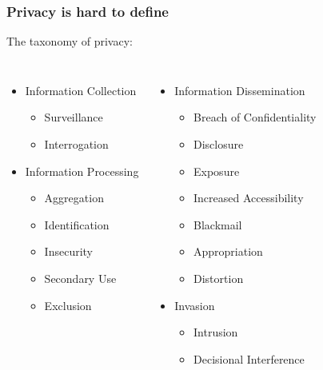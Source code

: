 \documentclass{beamer}
\begin{document}
\begin{frame}

\frametitle{Privacy is hard to define}

The taxonomy of privacy:

\begin{columns}[c] %

    \begin{itemize}
    \item Information Collection
      \begin{itemize}
      \item Surveillance
      \item Interrogation
      \end{itemize}
    \item Information Processing
      \begin{itemize}
      \item Aggregation
      \item Identification
      \item Insecurity
      \item Secondary Use
      \item Exclusion
      \end{itemize}

    \end{itemize}



    \begin{itemize}
    \item Information Dissemination
      \begin{itemize}
      \item Breach of Confidentiality
      \item Disclosure
      \item Exposure
      \item Increased Accessibility
      \item Blackmail
      \item Appropriation
      \item Distortion
        \end{itemize}
    \item Invasion
      \begin{itemize}
      \item Intrusion
      \item Decisional Interference

        \end{itemize}

      \end{itemize}

    \end{columns}


\end{frame}
\end{document}
